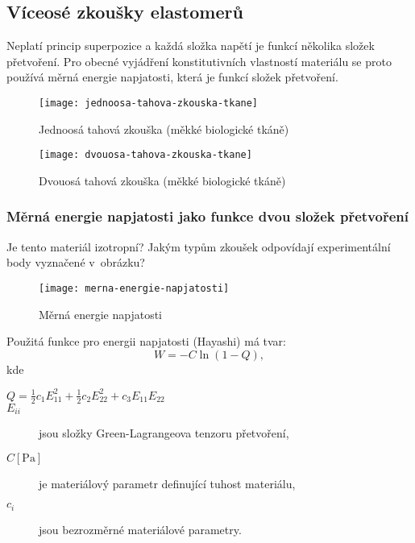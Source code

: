 
\subsection{Víceosé zkoušky elastomerů}
Neplatí princip superpozice a každá složka napětí je funkcí několika složek přetvoření.
Pro obecné vyjádření konstitutivních vlastností materiálu se proto používá měrná energie napjatosti, která je funkcí složek přetvoření.

\begin{figure}[H]
	\centering
	\texttt{[image: jednoosa-tahova-zkouska-tkane]}
	\caption{Jednoosá tahová zkouška (měkké biologické tkáně)}
	\label{fig:jednoosa-tahova-zkouska-tkane}
\end{figure}

\begin{figure}[H]
	\centering
	\texttt{[image: dvouosa-tahova-zkouska-tkane]}
	\caption{Dvouosá tahová zkouška (měkké biologické tkáně)}
	\label{fig:dvouosa-tahova-zkouska-tkane}
\end{figure}

\subsubsection{Měrná energie napjatosti jako funkce dvou složek přetvoření}
Je tento materiál izotropní?
Jakým typům zkoušek odpovídají experimentální body vyznačené v~obrázku?
\begin{figure}[H]
	\centering
	\texttt{[image: merna-energie-napjatosti]}
	\caption{Měrná energie napjatosti}
	\label{fig:merna-energie-napjatosti}
\end{figure}

Použitá funkce pro energii napjatosti (Hayashi) má tvar:
\begin{equation}
	W = -C \ln(1-Q),
\end{equation}
kde
\begin{description}
	\item[{$Q = \frac{1}{2} c_1 E_{11}^2 + \frac{1}{2} c_2 E_{22}^2 + c_3 E_{11} E_{22}$}]
	\item[$E_{ii}$] jsou složky Green-Lagrangeova tenzoru přetvoření, 
	\item[{$C [\si{\pascal}]$}] je materiálový parametr definující tuhost materiálu,
	\item[$c_i$] jsou bezrozměrné materiálové parametry.
\end{description}

